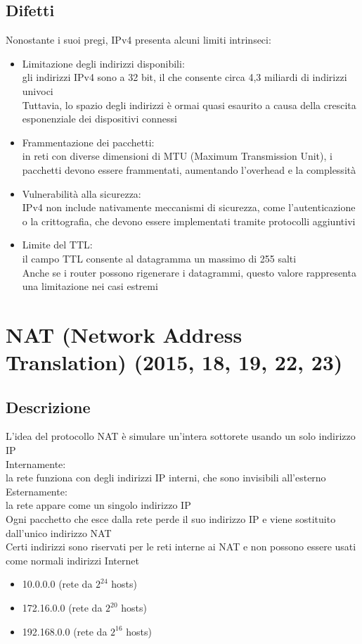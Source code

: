 \documentclass[10pt,oneside,a4paper]{article}
\begin{document}
\subsection{Difetti}
Nonostante i suoi pregi, IPv4 presenta alcuni limiti intrinseci:
\begin{itemize}
\item Limitazione degli indirizzi disponibili:\\
gli indirizzi IPv4 sono a 32 bit, il che consente circa 4,3 miliardi di indirizzi univoci\\
Tuttavia, lo spazio degli indirizzi è ormai quasi esaurito a causa della crescita esponenziale dei dispositivi connessi
\item Frammentazione dei pacchetti:\\
in reti con diverse dimensioni di MTU (Maximum Transmission Unit), i pacchetti devono essere frammentati, aumentando l'overhead e la complessità
\item Vulnerabilità alla sicurezza:\\
IPv4 non include nativamente meccanismi di sicurezza, come l'autenticazione o la crittografia, che devono essere implementati tramite protocolli aggiuntivi
\item Limite del TTL:\\
il campo TTL consente al datagramma un massimo di 255 salti\\
Anche se i router possono rigenerare i datagrammi, questo valore rappresenta una limitazione nei casi estremi
\end{itemize}
\section{NAT (Network Address Translation) (2015, 18, 19, 22, 23)}
\subsection{Descrizione}
L'idea del protocollo NAT è simulare un'intera sottorete usando un solo indirizzo IP\\
Internamente:\\
la rete funziona con degli indirizzi IP interni, che sono invisibili all'esterno\\
Esternamente:\\
la rete appare come un singolo indirizzo IP\\
Ogni pacchetto che esce dalla rete perde il suo indirizzo IP e viene sostituito dall'unico indirizzo NAT\\
Certi indirizzi sono riservati per le reti interne ai NAT e non possono essere usati come normali indirizzi Internet\\
\begin{itemize}
\item 10.0.0.0 (rete da $2^{24}$ hosts)
\item 172.16.0.0 (rete da $2^{20}$ hosts)
\item 192.168.0.0 (rete da $2^{16}$ hosts)
\end{itemize}
\end{document}
